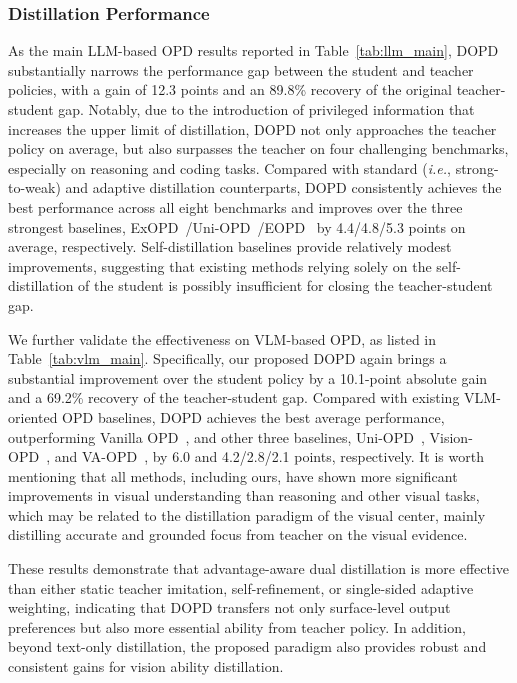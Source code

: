 \documentclass[]{jingdong}
\theoremstyle{plain}
\theoremstyle{definition}
\theoremstyle{remark}
\begin{document}
\subsubsection{Distillation Performance}
As the main LLM-based OPD results reported in Table~\ref{tab:llm_main}, DOPD substantially narrows the performance gap between the student and teacher policies, with a gain of 12.3 points and an 89.8\% recovery of the original teacher-student gap. Notably, due to the introduction of privileged information that increases the upper limit of distillation, DOPD not only approaches the teacher policy on average, but also surpasses the teacher on four challenging benchmarks, especially on reasoning and coding tasks. 
Compared with standard (\textit{i.e.}, strong-to-weak) and adaptive distillation counterparts, DOPD consistently achieves the best performance across all eight benchmarks and improves over the three strongest baselines, ExOPD~\citep{yang2026learning}/Uni-OPD~\citep{hou2026uni}/EOPD~\citep{jin2026entropy} by 4.4/4.8/5.3 points on average, respectively. 
Self-distillation baselines provide relatively modest improvements,  suggesting that existing methods relying solely on the self-distillation of the student is possibly insufficient for closing the teacher-student gap. 



We further validate the effectiveness on VLM-based OPD, as listed in Table~\ref{tab:vlm_main}. Specifically, our proposed DOPD again brings a substantial improvement over the student policy by  a 10.1-point absolute gain and a 69.2\% recovery of the teacher-student gap.  Compared with existing VLM-oriented OPD baselines, DOPD achieves the best average performance, outperforming Vanilla OPD~\citep{thinking2025opd}, and other three baselines, Uni-OPD~\citep{hou2026uni}, Vision-OPD~\citep{yuan2026vision}, and VA-OPD~\citep{liu2026visual}, by 6.0 and 4.2/2.8/2.1 points, respectively. 
It is worth mentioning that all methods, including ours, have shown more significant improvements in visual understanding than reasoning and other visual tasks, which may be related to the distillation paradigm of the visual center, mainly distilling accurate and grounded focus from teacher on the visual evidence.



These results demonstrate that advantage-aware dual distillation is more effective than either static teacher imitation, self-refinement, or single-sided adaptive weighting, indicating that DOPD transfers not only surface-level output preferences but also more essential ability from teacher policy. 
In addition, beyond text-only distillation, the proposed paradigm also provides robust and consistent gains for vision ability distillation.
\end{document}
